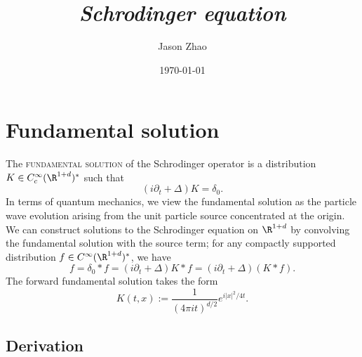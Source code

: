 \documentclass[reqno]{amsart}
\title
{
	\emph{Schrodinger equation}
}
\author{Jason Zhao}
\date{\today}
\theoremstyle{definition}
\theoremstyle{remark}
\renewcommand{\emph}{\textsc}
\begin{document}
\maketitle
\tableofcontents

\section{Fundamental solution}

The \emph{fundamental solution} of the Schrodinger operator is a distribution $K \in C^\infty_c (\R^{1 + d})^*$ such that 
	\[ (i \partial_t + \Delta) K = \delta_0. \]
In terms of quantum mechanics, we view the fundamental solution as the particle wave evolution arising from the unit particle source concentrated at the origin. We can construct solutions to the Schrodinger equation on $\R^{1 + d}$ by convolving the fundamental solution with the source term; for any compactly supported distribution $f \in C^\infty (\R^{1 + d})^*$, we have
	\[ f = \delta_0 * f = (i \partial_t + \Delta) K * f = (i \partial_t + \Delta)( K* f). \]
The forward fundamental solution takes the form 
	\[ K(t, x) := \frac{1}{(4\pi i t)^{d/2}} e^{i |x|^2/4t}. \]
	

\subsection{Derivation}
\end{document}
